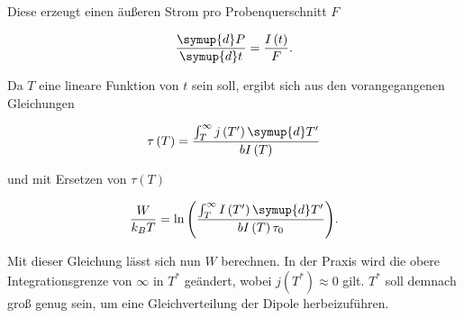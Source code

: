 Diese erzeugt einen äußeren Strom pro Probenquerschnitt $F$ 

\begin{equation*}
    \frac{\symup{d}P}{\symup{d}t} = \frac{I\left(t\right)}{F}.
\end{equation*}

Da $T$ eine lineare Funktion von $t$ sein soll, ergibt sich aus den vorangegangenen Gleichungen 

\begin{equation*}
    \tau\left(T\right) = \frac{\int_T^\infty j\left(T'\right)\symup{d}T'}{bI\left(T\right)}
\end{equation*}

und mit Ersetzen von $\tau\left(T\right)$

\begin{equation*}
    \frac{W}{k_B T} = \ln{\left(\frac{\int_T^\infty I\left(T'\right)\symup{d}T'}{bI\left(T\right)\tau_0}\right)}.
\end{equation*}

Mit dieser Gleichung lässt sich nun $W$ berechnen. In der Praxis wird die obere Integrationsgrenze von $\infty$ in $T^*$ geändert, wobei
$j\left(T^*\right)\approx 0$ gilt. $T^*$ soll demnach groß genug sein, um eine Gleichverteilung der Dipole herbeizuführen. 
